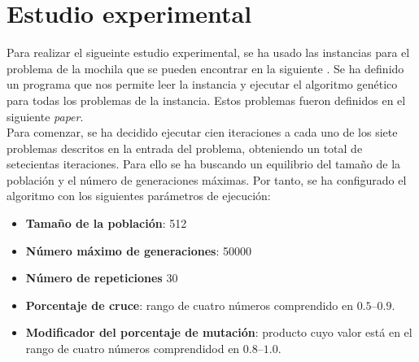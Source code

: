\documentclass[runningheads]{llncs}
\begin{document}
\section{Estudio experimental}

Para realizar el sigueinte estudio experimental, se ha usado las instancias para el problema de la mochila
que se pueden encontrar en la siguiente \cite{ref_or_library}. Se ha definido un programa que nos permite leer
la instancia y ejecutar el algoritmo genético para todas los problemas de la instancia. Estos problemas fueron
definidos en el siguiente \cite{ref_balas} \textit{paper}. \\
Para comenzar, se ha decidido ejecutar cien iteraciones a cada uno de los siete problemas descritos en la entrada del problema,
obteniendo un total de setecientas iteraciones. Para ello se ha buscando un equilibrio del tamaño de la población
y el número de generaciones máximas. Por tanto, se ha configurado el algoritmo con los siguientes parámetros de ejecución:
\begin{itemize}
	\item \textbf{Tamaño de la población}: 512
	\item \textbf{Número máximo de generaciones}: 50000
	\item \textbf{Número de repeticiones} 30
	\item \textbf{Porcentaje de cruce}: rango de cuatro números comprendido en $\numrange[range-phrase = --]{0.5}{0.9}$.
	\item \textbf{Modificador del porcentaje de mutación}:  producto cuyo valor está en el rango de cuatro números comprendidod en $\numrange[range-phrase = --]{0.8}{1.0}$.
\end{itemize}
\end{document}
